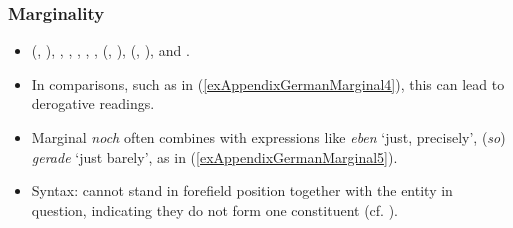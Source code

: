 \subsubsection{Marginality}\largerpage[2]
\label{appendixGermanMarginal}
\begin{itemize}
	\sloppy
	\item \citeauthor{Beck2016} (\citeyear{Beck2016}, \citeyear{Beck2020}), \textcite[s.v. \textit{noch}]{DWDS}, \textcite[s.v. \textit{noch}]{Duden}, \textcite{Eckardt2006}, \textcite{HoepelmanRohrer1981}, \textcite{Klein2018}, \citeauthor{Koenig1977} (\citeyear{Koenig1977}, \citeyear[151–155]{Koenig1991}), \textcite[178–179]{KoenigEtAl1993} \citeauthor{Loebner1989} (\citeyear{Loebner1989}, \citeyear{Loebner1999}), 	\textcite{Shetter1966} and \textcite{Umbach2009}.
	\item In comparisons, such as in (\ref{exAppendixGermanMarginal4}), this can lead to derogative readings.
	\item Marginal \textit{noch} often combines with expressions like \textit{eben} \lq just, precisely', (\textit{so}) \textit{gerade} \lq just barely', as in (\ref{exAppendixGermanMarginal5}).
	\item Syntax: cannot stand in forefield position together with the entity in question, indicating they do not form one constituent (cf. \cite[151]{Koenig1991}).
\end{itemize}
